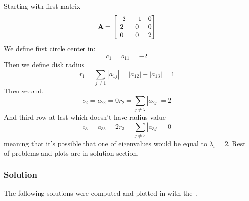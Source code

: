 Starting with first matrix
\begin{equation*}
    \mathbf{A} = 
    \begin{bmatrix}
        -2 & -1 &  0\\
         2 &  0 &  0\\
         0 &  0 &  2 
    \end{bmatrix}
\end{equation*}
We define first circle center in:
\begin{equation*}
     c_1 = a_{11} = -2
\end{equation*}
Then we define disk radius
\begin{equation*}
    r_1 = \sum_{j \neq 1} |a_{1j}| = |a_{12}| + |a_{13}| = 1 
\end{equation*}
Then second:
\begin{equation*}
    c_2 = a_{22} = 0
    r_2 = \sum_{j \neq 2} |a_{2j}| = 2
\end{equation*}
And third row at last which doesn't have radius value
\begin{equation*}
    c_3 = a_{33} = 2
    r_3 = \sum_{j \neq 3} |a_{3j}| = 0
\end{equation*}
meaning that it's possible that one of eigenvalues would be equal to $\lambda_i = 2$.
Rest of problems and plots are in solution section.
\subsubsection*{Solution}
The following solutions were computed and plotted in \MATLAB{} with the~.

